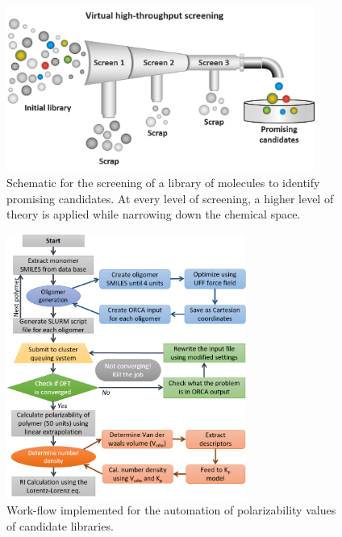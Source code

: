 \begin{figure}[htbp]
	\centering
	\includegraphics[width=0.9\textwidth]{Chapter-4/Figures/screen_pipe.png}
	\caption{Schematic for the screening of a library of molecules to identify promising candidates. At every level of screening, a higher level of theory is applied while narrowing down the chemical space.} 
	\label{fig:screen_pipe} 
\end{figure}  

\begin{figure}[htbp]
	\centering
	\includegraphics[width=0.7\textwidth]{Chapter-4/Figures/workflow.png}
	\caption{Work-flow implemented for the automation of polarizability values of candidate libraries.} 
	\label{fig:workflow} 
\end{figure}  


